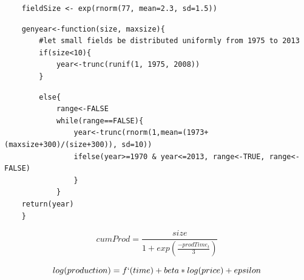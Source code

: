 \documentclass{beamer}
\begin{document}
\begin{frame}
	\begin{verbatim}
	fieldSize <- exp(rnorm(77, mean=2.3, sd=1.5))
	\end{verbatim}
\end{frame}


\begin{frame}
	\small \begin{verbatim}
	genyear<-function(size, maxsize){
		#let small fields be distributed uniformly from 1975 to 2013
		if(size<10){
			year<-trunc(runif(1, 1975, 2008))	
		} 
	\end{verbatim}
\end{frame}





\begin{frame}
	\small \begin{verbatim}
		else{
			range<-FALSE
			while(range==FALSE){
				year<-trunc(rnorm(1,mean=(1973+(maxsize+300)/(size+300)), sd=10))
				ifelse(year>=1970 & year<=2013, range<-TRUE, range<-FALSE)
				}	
			}
	return(year)
	}
	\end{verbatim}	
\end{frame}





\begin{frame}[plain]
	\begin{equation}
		cumProd=\frac{size}{1+exp(\frac{-prodTime_t}{3})}
		\label{cumProd_equation}
	\end{equation}
\end{frame}


\begin{frame}[plain]
	\begin{equation}
		log(production) = f`(time) + beta*log(price) + epsilon
	\end{equation}
\end{frame}
\end{document}
